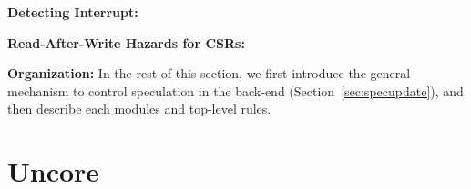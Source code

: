 \documentclass[12pt]{article}
\begin{document}
\noindent\textbf{Detecting Interrupt:}

\noindent\textbf{Read-After-Write Hazards for CSRs:}

\noindent\textbf{Organization:}
In the rest of this section, we first introduce the general mechanism to control speculation in the back-end (Section~\ref{sec:specupdate}), and then describe each modules and top-level rules.





























\section{Uncore}
\end{document}
